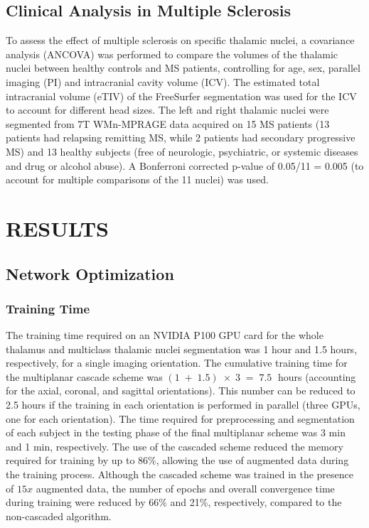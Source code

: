 \subsection{Clinical Analysis in Multiple Sclerosis} To assess the effect of multiple sclerosis on specific thalamic nuclei, a covariance analysis (ANCOVA) was performed to compare the volumes of the thalamic nuclei between healthy controls and MS patients, controlling for age, sex, parallel imaging (PI) and intracranial cavity volume (ICV). The estimated total intracranial volume (eTIV) of the FreeSurfer segmentation was used for the ICV to account for different head sizes. The left and right thalamic nuclei were segmented from 7T WMn-MPRAGE data acquired on 15 MS patients (13 patients had relapsing remitting MS, while 2 patients had secondary progressive MS) and 13 healthy subjects (free of neurologic, psychiatric, or systemic diseases and drug or alcohol abuse). A Bonferroni corrected p-value of 0.05/11 = 0.005 (to account for multiple comparisons of the 11 nuclei) was used.
    
\section{RESULTS}




\subsection{Network Optimization}



\subsubsection{Training Time} The training time required on an NVIDIA P100 GPU card for the whole thalamus and multiclass thalamic nuclei segmentation was 1 hour and 1.5 hours, respectively, for a single imaging orientation. The cumulative training time for the multiplanar cascade scheme was $(1\;+\;1.5)\;\times\;3\;=\;7.5\; $ hours (accounting for the axial, coronal, and sagittal orientations). This number can be reduced to 2.5 hours if the training in each orientation is performed in parallel (three GPUs, one for each orientation). The time required for preprocessing and segmentation of each subject in the testing phase of the final multiplanar scheme was 3 min and 1 min, respectively. The use of the cascaded scheme reduced the memory required for training by up to 86\%, allowing the use of augmented data during the training process. Although the cascaded scheme was trained in the presence of $15x $ augmented data, the number of epochs and overall convergence time during training were reduced by 66\% and 21\%, respectively, compared to the non-cascaded algorithm. 



